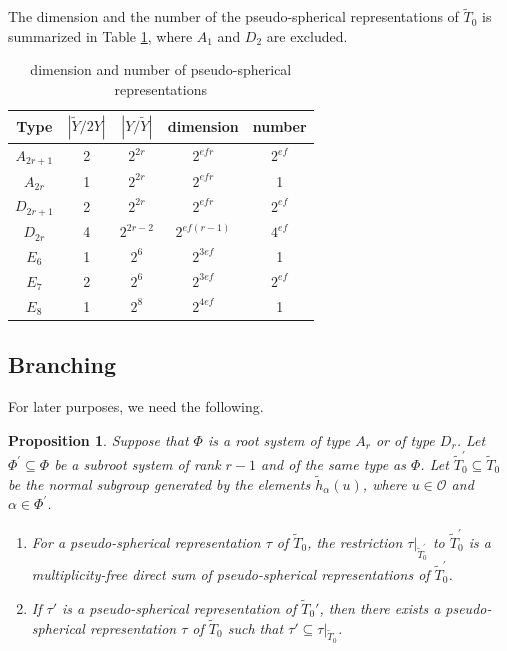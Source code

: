 \documentclass[10pt, letterpaper]{amsart}
\theoremstyle{plain}
\newtheorem{Prop}[equation]{Proposition}
\theoremstyle{definition}
\numberwithin{equation}{section}
\newcommand{\htt}{\tilde{h}}
\newcommand{\Tt}{\widetilde{T}}
\newcommand{\Yt}{\widetilde{Y}}
\newcommand{\Ocal}{\mathcal{O}}
\begin{document}
The dimension and the number of the pseudo-spherical representations of $\Tt_{0}$ is summarized in Table \ref{T:table2}, where $A_{1}$ and $D_2$ are excluded.

\begin{table}[h]
\caption{dimension and number of pseudo-spherical representations}\label{T:table2}
\centering
\renewcommand{\arraystretch}{1.5}
\begin{tabular}{ccccc}
\hline
Type & $\left| \Yt\slash 2Y\right|$ & $\left|Y\slash \Yt\right|$ &dimension &number \\\hline\hline
$A_{2r+1}$ & 2 & $2^{2r}$& $2^{efr}$ & $2^{ef}$\\
$A_{2r}$ &  1 & $2^{2r}$ & $2^{efr}$ & 1\\\hline
$D_{2r+1}$  & 2 & $2^{2r}$ & $2^{efr}$ & $2^{ef}$\\
$D_{2r}$ & 4  & $2^{2r-2}$ & $2^{ef(r-1)}$ & $4^{ef}$\\\hline
 $E_6$ & 1 & $2^6$ & $2^{3ef}$ & 1\\\hline
 $E_7$ & 2 & $2^6$ & $2^{3ef}$ & $2^{ef}$ \\\hline
 $E_8$ & 1 & $2^8$ & $2^{4ef}$ & 1\\\hline
\end{tabular}
\end{table}


\subsection{Branching}

For later purposes, we need the following.

\begin{Prop}\label{PseudoSphericalBranch}
	Suppose that $\Phi$ is a root system of type $A_r$ or of type $D_r$. Let $\Phi^{\prime}\subseteq\Phi$ be a subroot system of rank $r-1$ and of the same type as $\Phi$. Let $\Tt_{0}^{\prime}\subseteq \Tt_{0}$ be the normal subgroup generated by the elements $\htt_{\alpha}(u)$, where $u\in \Ocal$ and $\alpha\in\Phi^{\prime}$. 
    \begin{enumerate}[(1)]
    \item For a pseudo-spherical representation $\tau$ of $\Tt_{0}$, the restriction $\tau|_{\Tt_0^{\prime}}$ to $\Tt_{0}^{\prime}$ is a multiplicity-free direct sum of pseudo-spherical representations of $\Tt_{0}^{\prime}$.
    \item If $\tau'$ is a pseudo-spherical representation of $\Tt_0'$, then there exists a pseudo-spherical representation $\tau$ of $\Tt_0$ such that $\tau'\subseteq\tau|_{\Tt_0}$.
    \end{enumerate}
\end{Prop}
\end{document}
